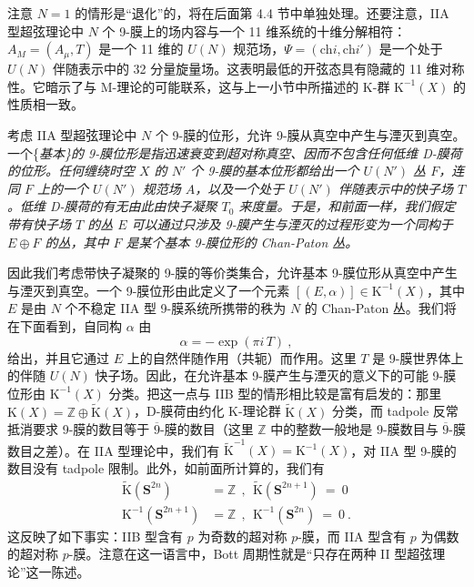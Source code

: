 \documentclass[11pt,a4paper]{ctexart}
\begin{document}
注意 \(N=1\) 的情形是``退化''的，将在后面第 4.4 节中单独处理。还要注意，IIA 型超弦理论中 \(N\) 个 9-膜上的场内容与一个 11 维系统的十维分解相符：\(A_M=(A_{\mu},T)\) 是一个 11 维的 \(U(N)\) 规范场，\(\Psi=(\mathrm{ch}i,\mathrm{ch}i')\) 是一个处于 \(U(N)\) 伴随表示中的 32 分量旋量场。这表明最低的开弦态具有隐藏的 11 维对称性。它暗示了与 M-理论的可能联系，这与上一小节中所描述的 K-群 \({\mathrm K}^{-1}(X)\) 的性质相一致。

考虑 IIA 型超弦理论中 \(N\) 个 9-膜的位形，允许 9-膜从真空中产生与湮灭到真空。一个\{\it 基本\}的 9-膜位形是指迅速衰变到超对称真空、因而不包含任何低维 D-膜荷的位形。任何缠绕时空 \(X\) 的 \(N'\) 个 9-膜的基本位形都给出一个 \(U(N')\) 丛 \(F\)，连同 \(F\) 上的一个 \(U(N')\) 规范场 \(A\)，以及一个处于 \(U(N')\) 伴随表示中的快子场 \(T\)。低维 D-膜荷的有无由此由快子凝聚 \(T_0\) 来度量。于是，和前面一样，我们假定带有快子场 \(T\) 的丛 \(E\) 可以通过只涉及 9-膜产生与湮灭的过程形变为一个同构于 \(E\oplus F\) 的丛，其中 \(F\) 是某个基本 9-膜位形的 Chan-Paton 丛。

因此我们考虑带快子凝聚的 9-膜的等价类集合，允许基本 9-膜位形从真空中产生与湮灭到真空。一个 9-膜位形由此定义了一个元素 \([(E,\alpha)]\in {\mathrm K}^{-1}(X)\)，其中 \(E\) 是由 \(N\) 个不稳定 IIA 型 9-膜系统所携带的秩为 \(N\) 的 Chan-Paton 丛。我们将在下面看到，自同构 \(\alpha\) 由 \[\alpha=-\exp(\pi i\,T) \ ,\] 给出，并且它通过 \(E\) 上的自然伴随作用（共轭）而作用。这里 \(T\) 是 9-膜世界体上的伴随 \(U(N)\) 快子场。因此，在允许基本 9-膜产生与湮灭的意义下的可能 9-膜位形由 \({\mathrm K}^{-1}(X)\) 分类。把这一点与 IIB 型的情形相比较是富有启发的：那里 \({\mathrm K}(X)= {\mathbb{Z}}\oplus \widetilde{{\mathrm K}}(X)\)，D-膜荷由约化 K-理论群 \(\widetilde{{\mathrm K}}(X)\) 分类，而 tadpole 反常抵消要求 9-膜的数目等于 \(\overline{9}\)-膜的数目（这里 \({\mathbb{Z}}\) 中的整数一般地是 9-膜数目与 \(\overline{9}\)-膜数目之差）。在 IIA 型理论中，我们有 \(\widetilde{{\mathrm K}}^{-1}(X)= {\mathrm K}^{-1}(X)\)，对 IIA 型 9-膜的数目没有 tadpole 限制。此外，如前面所计算的，我们有 \[\begin{matrix}
\widetilde{{\mathrm K}}({\mathbf S}^{2n})&= {\mathbb{Z}}\ \ , \ \ \widetilde{{\mathrm K}}({\mathbf S}^{2n+1})~=~0\\
{\mathrm K}^{-1}({\mathbf S}^{2n+1})&= {\mathbb{Z}}\ \ , \ \ {\mathrm K}^{-1}({\mathbf S}^{2n})~=~0\ .
\end{matrix}\] 这反映了如下事实：IIB 型含有 \(p\) 为奇数的超对称 \(p\)-膜，而 IIA 型含有 \(p\) 为偶数的超对称 \(p\)-膜。注意在这一语言中，Bott 周期性就是``只存在两种 II 型超弦理论''这一陈述。
\end{document}
